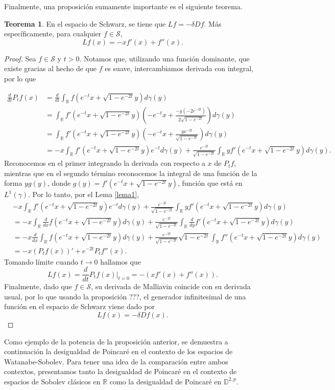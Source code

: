 \documentclass[letterpaper,twoside,12pt]{book}
\newcommand{\R}{\mathbb{R}}
\newcommand{\D}{\mathbb{D}}
\renewcommand{\S}{\mathcal{S}}
\newcommand{\1}{\mathds{1}}
\renewcommand{\to}{\rightarrow}
\theoremstyle{definition}
\theoremstyle{definition}
\newtheorem{teo}{Teorema}
\theoremstyle{remark}
\theoremstyle{definition}
\theoremstyle{definition}
\theoremstyle{definition}
\theoremstyle{definition}
\theoremstyle{definition}
\begin{document}
Finalmente, una proposición sumamente importante es el siguiente teorema.
\begin{teo} 
En el espacio de Schwarz, se tiene que $Lf=-\delta Df$. Más específicamente, para cualquier $f\in \S$, 
\[
Lf(x)=-xf'(x)+f''(x).   
\]
\end{teo}
 \begin{proof} 
   Sea $f\in \S$ y $t>0$. Notamos que, utilizando una función dominante, que existe gracias al hecho de que $f$ es suave, intercambiamos derivada con integral, por lo que
   
   \begin{align*}
    \frac{d}{dt}P_tf(x)&=\frac{d}{dt}\int_\R f(e^{-t}x+\sqrt{1-e^{-2t}}y)d\gamma(y)\\
    &=\int_\R f'(e^{-t}x+\sqrt{1-e^{-2t}}y)\left(-e^{-t}x+\frac{-y(-2e^{-2t})}{2\sqrt{1-e^{-2t}}}\right)d\gamma(y)\\
    &=\int_\R f'(e^{-t}x+\sqrt{1-e^{-2t}}y)\left(-e^{-t}x+\frac{ye^{-2t}}{\sqrt{1-e^{-2t}}}\right)d\gamma(y)\\
    &=-x\int_\R f'(e^{-t}x+\sqrt{1-e^{-2t}}y)e^{-t}d\gamma(y)+\frac{e^{-2t}}{\sqrt{1-e^{-2t}}}\int_\R yf'(e^{-t}x+\sqrt{1-e^{-2t}}y)d\gamma(y).
   \end{align*}
   Reconocemos en el primer integrando la derivada con respecto a $x$ de $P_tf$, mientras que en el segundo término reconocemos la integral de una función de la forma $yg(y)$, donde $g(y)=f'(e^{-t}x+\sqrt{1-e^{-2t}}y)$, función que está en $L^1(\gamma)$. Por lo tanto, por el Lema \ref{lema1}, 
    \begin{align*}
        &-x\int_\R f'(e^{-t}x+\sqrt{1-e^{-2t}}y)e^{-t}d\gamma(y)+\frac{e^{-2t}}{\sqrt{1-e^{-2t}}}\int_\R yf'(e^{-t}x+\sqrt{1-e^{-2t}}y)d\gamma(y)\\
        &=-x\int_\R \frac{d}{dx}f(e^{-t}x+\sqrt{1-e^{-2t}}y)d\gamma(y)+\frac{e^{-2t}}{\sqrt{1-e^{-2t}}}\int_\R \frac{d}{dy}f'(e^{-t}x+\sqrt{1-e^{-2t}}y)d\gamma(y)\\
        &=-x\frac{d}{dx}\int_\R f(e^{-t}x+\sqrt{1-e^{-2t}}y)d\gamma(y)+\frac{e^{-2t}}{\sqrt{1-e^{-2t}}}\sqrt{1-e^{-2t}}\int_\R f''(e^{-t}x+\sqrt{1-e^{-2t}}y)d\gamma(y)\\
        &=-x(P_tf(x))'+e^{-2t}P_tf''(x).
    \end{align*}
    Tomando límite cuando $t\to0$ hallamos que 
    \[
    Lf(x)=\frac{d}{dt}P_tf(x)\bigg|_{t=0}=-\left(xf'(x)+f''(x)\right).
    \]
    Finalmente, dado que $f\in \S$, su derivada de Malliavin coincide con su derivada usual, por lo que usando la proposición ???, el generador infinitesimal de una función en el espacio de Schwarz viene dado por 
    \[
    Lf(x)=-\delta Df(x).
    \]
  \end{proof}
Como ejemplo de la potencia de la proposición anterior, se demuestra a continuación la desigualdad de Poincaré en el contexto de los espacios de Watanabe-Sobolev.
Para tener una idea de la comparación entre ambos contextos, presentamos tanto la desigualdad de Poincaré en el contexto de espacios de Sobolev clásicos en $\R$ como la desigualdad de Poincaré en $\D^{2,p}$.
\end{document}
